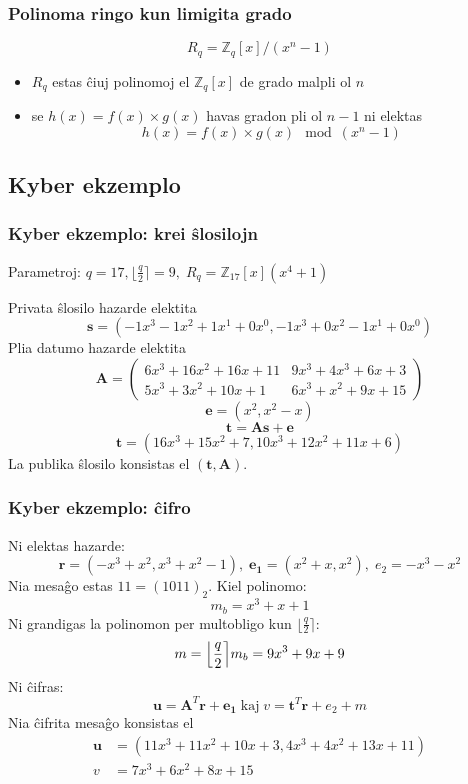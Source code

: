 \documentclass[utf8]{scrartcl}
\begin{document}
\begin{frame}
  \frametitle{Polinoma ringo kun limigita grado}
  \[
    R_q = \mathbb{Z}_q[x]/(x^n-1)
  \]

  \begin{itemize}
  \item<+-> $R_q$ estas ĉiuj polinomoj el $\mathbb{Z}_q[x]$ de grado malpli ol $n$
  \item<+-> se $h(x) = f(x) \times g(x)$ havas gradon pli ol $n-1$ ni elektas
    \[h(x) = f(x) \times g(x) \mod (x^n-1)\]
  \end{itemize}

  \vspace{0.5em}
\end{frame}

\subsection*{Kyber ekzemplo}

\begin{frame}
  \frametitle{Kyber ekzemplo: krei ŝlosilojn}
  Parametroj: $q = 17, \bigl\lfloor\frac{q}{2}\bigr\rceil = 9, \; R_q = \mathbb{Z}_{17}[x](x^4 + 1)$\par
  \pause
  \vspace{0.5em}
  Privata ŝlosilo hazarde elektita
  \[ \mathbf{s} = \left( - 1x^3 - 1x^2 + 1x^1 + 0x^0, - 1x^3 +0x^2 - 1x^1 + 0x^0 \right) \]
  \pause
  Plia datumo hazarde elektita
  \[
    \mathbf{A} =
    \begin{pmatrix}
      6x^3 + 16x^2 + 16x + 11 & 9x^3 + 4x^3 + 6x + 3 \\
      5x^3 + 3x^2 + 10x +1    & 6x^3 + x^2 + 9x + 15
    \end{pmatrix}
  \]
  \[
    \mathbf{e} = \left( x^2, x^2 - x \right)
  \]
  \[
    \mathbf{t} = \mathbf{A}\mathbf{s} + \mathbf{e}
  \]
  \[
    \mathbf{t} = \left( 16x^3 + 15x^2 + 7, 10x^3 + 12x^2 + 11x + 6 \right)
  \]
  \pause
  La publika ŝlosilo konsistas el $(\mathbf{t}, \mathbf{A})$.
\end{frame}

\begin{frame}
  \frametitle{Kyber ekzemplo: ĉifro}
  Ni elektas hazarde:
  \[
    \mathbf{r} = \left( -x^3 + x^2, x^3 + x^2 - 1 \right), \; \mathbf{e_1} = \left( x^2 + x, x^2 \right), \; e_2 = -x^3 - x^2
  \]
  \pause
  Nia mesaĝo estas $11 = (1011)_2$. Kiel polinomo:
  \[m_b = x^3 + x + 1\]
  \pause
  Ni grandigas la polinomon per multobligo kun $\bigl\lfloor\frac{q}{2}\bigr\rceil$:
  \[m = \Bigl\lfloor\frac{q}{2}\Bigr\rceil m_b = 9x^3 + 9x + 9\]
  \pause
  Ni ĉifras:
  \[
    \mathbf{u} = \mathbf{A}^T\mathbf{r} + \mathbf{e_1} \;\text{kaj}\; v = \mathbf{t}^T\mathbf{r} + e_2 + m
  \]
  \pause
  Nia ĉifrita mesaĝo konsistas el
  \[
    \begin{split}
      \mathbf{u} & = (11x^3 + 11x^2 + 10x + 3, 4x^3 + 4x^2 + 13x + 11) \\
      v & = 7x^3 + 6x^2 + 8x + 15
    \end{split}
  \]
\end{frame}
\end{document}
